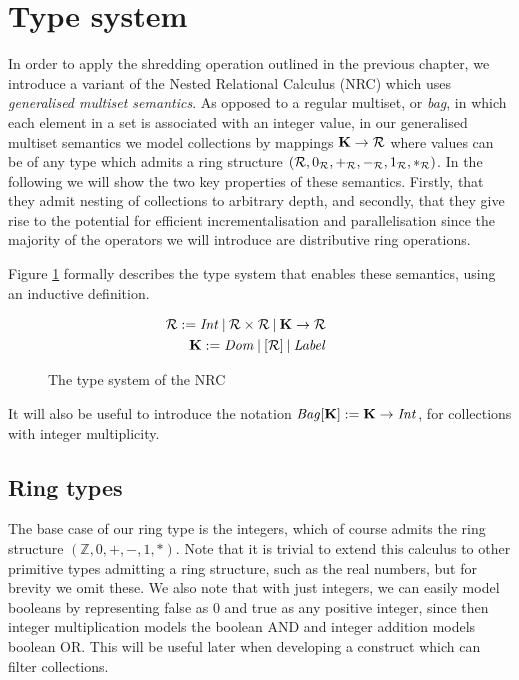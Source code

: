\section{Type system} {

In order to apply the shredding operation outlined in the previous chapter, we introduce a variant of the Nested Relational Calculus (NRC) which uses \textit{generalised multiset semantics}. As opposed to a regular multiset, or \textit{bag}, in which each element in a set is associated with an integer value, in our generalised multiset semantics we model collections by mappings $ \mathbf{K} \rightarrow \mathcal{R} $ where values can be of any type which admits a ring structure $ (\mathcal{R},0_{\mathcal{R}},+_{\mathcal{R}},-_{\mathcal{R}},1_{\mathcal{R}},*_{\mathcal{R}}) $. In the following we will show the two key properties of these semantics. Firstly, that they admit nesting of collections to arbitrary depth, and secondly, that they give rise to the potential for efficient incrementalisation and parallelisation since the majority of the operators we will introduce are distributive ring operations.

Figure \ref{nrctypes} formally describes the type system that enables these semantics, using an inductive definition.

\begin{figure}
\begin{equation*}
\begin{aligned}
\mathcal{R} := \textrm{\textit{Int}} \: | \: \mathcal{R} \times  \mathcal{R} \: | \: \mathbf{K} \rightarrow \mathcal{R} \\
\mathbf{K} := \textrm{\textit{Dom}} \: | \:  [\mathcal{R}]  \: | \: \textrm{\textit{Label}} \\
\end{aligned}
\qquad
\begin{aligned}
\end{aligned}
\end{equation*}
\caption{The type system of the NRC}
\label{nrctypes}
\end{figure}

It will also be useful to introduce the notation $\textrm{\textit{Bag}}[\mathbf{K}] := \mathbf{K} \rightarrow \textrm{\textit{Int}}$, for collections with integer multiplicity.

\subsection{Ring types} {
The base case of our ring type is the integers, which of course admits the ring structure $(\mathbb{Z},0,+,-,1,*)$. Note that it is trivial to extend this calculus to other primitive types admitting a ring structure, such as the real numbers, but for brevity we omit these. We also note that with just integers, we can easily model booleans by representing false as 0 and true as any positive integer, since then integer multiplication models the boolean AND and integer addition models boolean OR. This will be useful later when developing a construct which can filter collections.

}}
